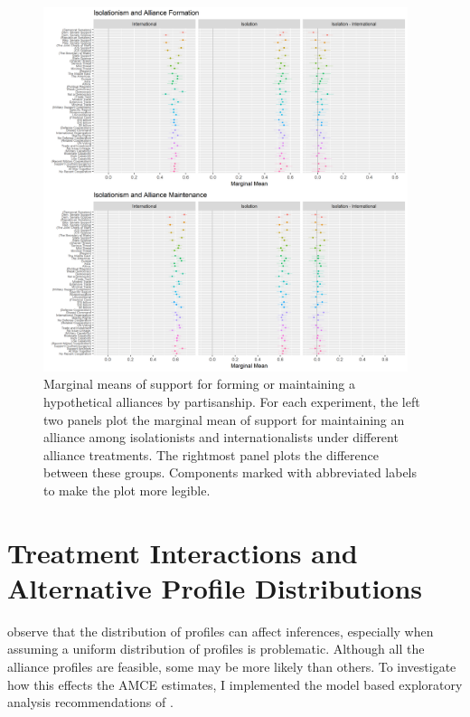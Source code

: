 \documentclass[12pt]{article}
\begin{document}
\begin{figure}
	\centering
		\includegraphics[width=0.95\textwidth]{isolation-plots.png}
	\caption{Marginal means of support for forming or maintaining a hypothetical alliances by partisanship. For each experiment, the left two panels plot the marginal mean of support for maintaining an alliance among isolationists and internationalists under different alliance treatments. The rightmost panel plots the difference between these groups. Components marked with abbreviated labels to make the plot more legible.}
	\label{fig:isolation-plots}
\end{figure}


\section{Treatment Interactions and Alternative Profile Distributions}


\citet{delaCuestaetal2021} observe that the distribution of profiles can affect inferences, especially when assuming a uniform distribution of profiles is problematic.
Although all the alliance profiles are feasible, some may be more likely than others. 
To investigate how this effects the AMCE estimates, I implemented the model based exploratory analysis recommendations of \citet{delaCuestaetal2021}. 
\end{document}
